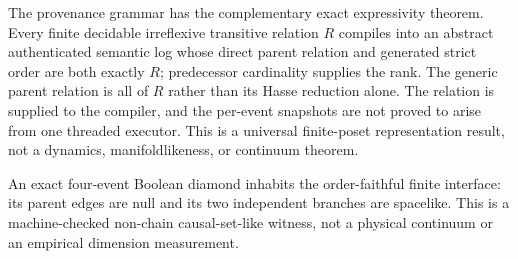 The provenance grammar has the complementary exact expressivity theorem.
Every finite decidable irreflexive transitive relation $R$ compiles into an
abstract authenticated semantic log whose direct parent relation and generated
strict order are both exactly $R$; predecessor cardinality supplies the rank.
The generic parent relation is all of $R$ rather than its Hasse reduction alone.
The relation is supplied to the compiler, and the per-event snapshots are not
proved to arise from one threaded executor. This is a universal finite-poset
representation result, not a dynamics, manifoldlikeness, or continuum theorem.

An exact four-event Boolean diamond inhabits the order-faithful finite interface:
its parent edges are null and its two independent branches are spacelike.
This is a machine-checked non-chain causal-set-like witness, not a physical
continuum or an empirical dimension measurement.

